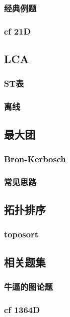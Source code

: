 \documentclass[10pt,a4paper]{article}
\begin{document}
\subsubsection{经典例题}

\subsubsection{cf 21D}

\subsection{LCA}
\subsubsection{ST表}

\subsubsection{离线}

\subsection{最大团}
\subsubsection{Bron-Kerbosch}

\subsubsection{常见思路}

\subsection{拓扑排序}
\subsubsection{toposort}

\subsection{相关题集}
\subsubsection{牛逼的图论题}

\subsubsection{cf 1364D}

\end{document}
